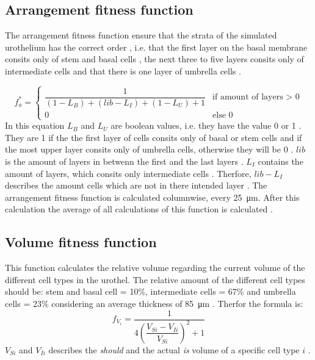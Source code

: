 \subsection{Arrangement fitness function}
The arrangement fitness function ensure that the strata of the simulated urothelium has the correct order \cite{Torelli2017}, i.e. that the first layer on the basal membrane consits only of stem and basal cells \cite{REFS}, the next three to five layers consits only of intermediate cells \cite{REFS} and that there is one layer of umbrella cells \cite{REFS}.

\begin{equation} 
f_{a}^{*} = \begin{cases}
\dfrac{1}{(1-L_{B})+(lib-L_{I})+(1-L_{U})+1} & \text{if amount of layers > 0} \\
0 & \text{else 0}
\end{cases}
\end{equation}
In this equation $L_{B}$ and $L_{U}$ are boolean values, i.e. they have the value 0 or 1 \cite{Torelli2017}. They are 1 if the the first layer of cells consits only of basal or stem cells and if the most upper layer consits only of umbrella cells, otherwise they will be 0 \cite{Torelli2017}.
$lib$ is the amount of layers in betwenn the first and the last layers \cite{Torelli2017}. $L_{I}$ contains the amount of layers, which consits only intermediate cells \cite{Torelli2017}. Therfore, $lib-L_{I}$ describes the amount cells which are not in there intended layer \cite{Torelli2017}. \newline
The arrangement fitness function is calculated columnwise, every \SI{25}{\micro\metre}. After this calculation the average of all calculations of this function is calculated \cite{Torelli2017}.

\subsection{Volume fitness function}
This function calculates the relative volume regarding the current volume of the different cell types in the urothel. The relative amount of the different cell types should be: stem and basal cell = 10\%, intermediate cells = 67\% and umbrella cells = 23\% considering an average thickness of \SI{85}{\micro\metre} \cite{Torelli2017}. Therfor the formula is:
\begin{equation} 
f_{V_{i}} = \dfrac{1}{4 (\dfrac{V_{Si}-V_{Ii}}{V_{Si}})^2 + 1}
\end{equation}
$V_{Si}$ and $V_{Ii}$ describes the \textit{should} and the actual \textit{is} volume of a specific cell type $i$ \cite{Torelli2017}. 

